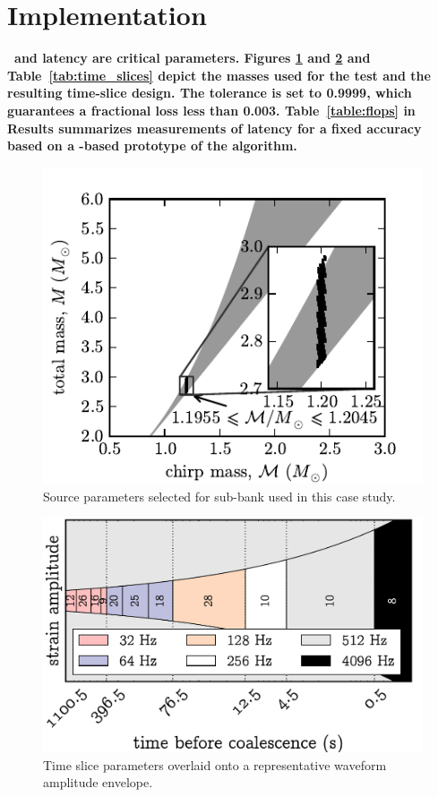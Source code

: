 \documentclass[portrait,plainboxedsections]{sciposter}
\begin{document}
\begin{minipage}[t]{0.25\textwidth}

\section*{Implementation}

\bf{}\rm\ and latency are critical parameters. Figures
\ref{fig:tmpltbank} and \ref{fig:time_slices} and Table~\ref{tab:time_slices}
depict the masses used for the test and the resulting time-slice design. The
\SVD{} tolerance is set to 0.9999, which guarantees a fractional \SNR{} loss
less than 0.003. Table~\ref{table:flops} in Results summarizes measurements of
latency for a fixed accuracy based on a \gstreamer{}-based prototype of the
\lloid{} algorithm.

\begin{figure}[h]
	\includegraphics[width=\textwidth]{figures/tmpltbank}
	\caption{\label{fig:tmpltbank}Source parameters selected for sub-bank used in this
case study.}
\end{figure}

\begin{figure}
\includegraphics[width=\textwidth]{figures/envelope}
\caption{\label{fig:time_slices} Time slice parameters overlaid onto a representative waveform amplitude envelope.}
\end{figure}


\end{minipage}
\end{document}
